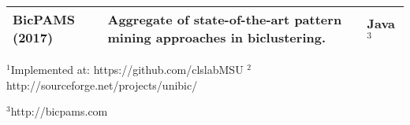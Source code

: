 \begin{table} [!t]
{\begin{tabular}{p{2cm}p{6cm}p{2cm}}
		BicPAMS (2017)
		& Aggregate of state-of-the-art pattern mining approaches in biclustering.
		& Java$^3$ \cite{henriques2017bicpams} \\
		
		\bottomrule
	
	\end{tabular}}
	\begin{tablenotes}
		\tiny
		\item $^1$Implemented at: https://github.com/clslabMSU $^2$http://sourceforge.net/projects/unibic/
		\item $^3$http://bicpams.com
	\end{tablenotes}
\end{table}

